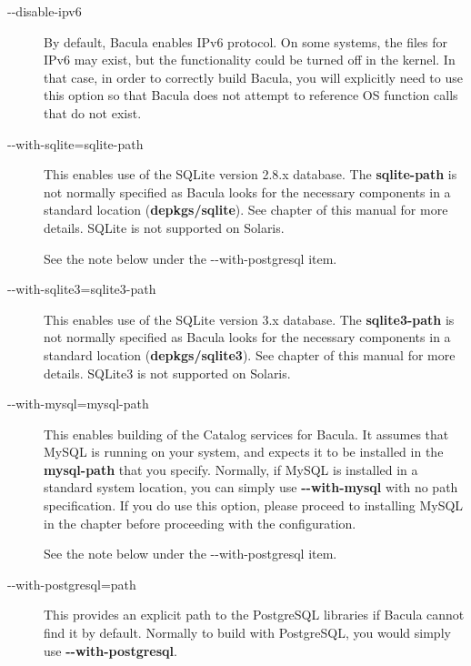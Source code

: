 \begin{description}
\item [ {-}{-}disable-ipv6 ]
   By default, Bacula enables IPv6 protocol. On some systems, the files
   for IPv6 may exist, but the functionality could be turned off in the
   kernel. In that case, in order to correctly build Bacula, you will
   explicitly need to use this option so that Bacula does not attempt
   to reference OS function calls that do not exist.

\item [ {-}{-}with-sqlite=\lt{}sqlite-path\gt{}]
   This enables use of the SQLite version 2.8.x database.  The {\bf
   sqlite-path} is not normally specified as Bacula looks for the necessary
   components in a standard location ({\bf depkgs/sqlite}).  See
    chapter of
    this manual for more details. SQLite is not supported on Solaris.

   See the note below under the {-}{-}with-postgresql item.

\item [ {-}{-}with-sqlite3=\lt{}sqlite3-path\gt{}]
   This enables use of the SQLite version 3.x database.  The {\bf
   sqlite3-path} is not normally specified as Bacula looks for the
   necessary components in a standard location ({\bf depkgs/sqlite3}).  See
    chapter of
   this manual for more details. SQLite3 is not supported on Solaris.

\item [ {-}{-}with-mysql=\lt{}mysql-path\gt{}]
   This enables building of the Catalog services for Bacula.  It assumes
   that MySQL is running on your system, and expects it to be installed in
   the {\bf mysql-path} that you specify.  Normally, if MySQL is installed
   in a standard system location, you can simply use {\bf {-}{-}with-mysql}
   with no path specification.  If you do use this option, please proceed
   to installing MySQL in the  chapter before proceeding with the configuration.

   See the note below under the {-}{-}with-postgresql item.

\item [ {-}{-}with-postgresql=\lt{}path\gt{}]
   This provides an explicit path to the PostgreSQL libraries if Bacula
   cannot find it by default.  Normally to build with PostgreSQL, you would
   simply use {\bf {-}{-}with-postgresql}.


\end{description}
